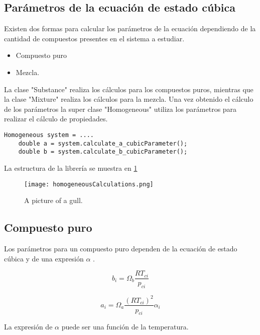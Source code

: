 \subsection{Parámetros de la ecuación de estado cúbica}


Existen dos formas para calcular los parámetros de la ecuación dependiendo de la cantidad de compuestos presentes en el sistema a estudiar.
\begin{itemize}
 \item Compuesto puro
 \item Mezcla. 
\end{itemize}

La clase "Substance" realiza los cálculos para los compuestos puros, mientras que la clase "Mixture" realiza los cálculos para la mezcla. Una vez obtenido el cálculo de los parámetros la super clase "Homogeneous" utiliza los parámetros para realizar el cálculo de propiedades.

\begin{lstlisting}[caption=Cualquier objeto tipo Homogeneous puede calcular los parámetrod de la ecuación de estado cúbica a y b]
	Homogeneous system = ....
	double a = system.calculate_a_cubicParameter();
	double b = system.calculate_b_cubicParameter();
\end{lstlisting}


La estructura de la librería se muestra en \ref{fig:homogeneousCalculations}

\begin{figure}[!h]
  
  \centering
    \texttt{[image: homogeneousCalculations.png]}
    \caption{A picture of a gull.}
    \label{fig:homogeneousCalculations}
\end{figure}

\subsection{Compuesto puro}
Los parámetros para un compuesto puro dependen de la ecuación de estado cúbica y de una expresión $\alpha$ .

\begin{equation}
	b_i = \Omega_b \frac{R T_{ci}}{p_{ci}} 
\end{equation}

\begin{equation}
 a_i = \Omega_a \frac{\left(R T_{ci}\right)^2}{p_{ci}} \alpha_i
\end{equation}

La expresión de $\alpha$ puede ser una función de la temperatura.

